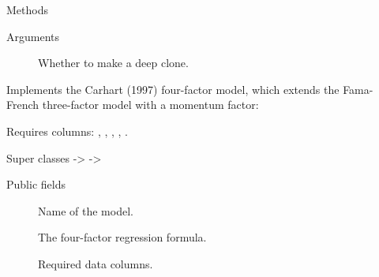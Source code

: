 \documentclass[a4paper]{book}
\begin{document}
\begin{Section}{Methods}
\begin{SubSection}{}

%
\begin{SubSubSection}{Arguments}

\begin{description}

\item[] Whether to make a deep clone.

\end{description}



\end{SubSubSection}

\end{SubSection}


\end{Section}
%
\begin{Description}
Implements the Carhart (1997) four-factor model, which extends the
Fama-French three-factor model with a momentum factor:

Requires columns: , , ,
, .
\end{Description}
%
\begin{Section}{Super classes}
 ->  -> 
\end{Section}
%
\begin{Section}{Public fields}

\begin{description}

\item[] Name of the model.

\item[] The four-factor regression formula.

\item[] Required data columns.

\end{description}


\end{Section}
\end{document}
